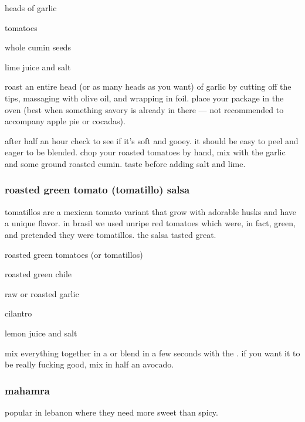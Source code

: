 \begin{ingredients}
  \item heads of garlic
  \item tomatoes
  \item whole cumin seeds
  \item lime juice and salt
\end{ingredients}

roast an entire head (or as many heads as you want) of garlic by cutting off 
the tips, massaging with olive oil, and wrapping in foil. place your package 
in the oven (best when something savory is already in there --- not 
recommended to accompany apple pie or \gls{cocada}s).

after half an hour check to see if it's soft and gooey. it should be easy to 
peel and eager to be blended. chop your roasted tomatoes by hand, mix with the 
garlic and some ground roasted cumin. taste before adding salt and lime.

\subsubsection{roasted green tomato (tomatillo) salsa}

tomatillos are a mexican tomato variant that grow with adorable husks and have 
a unique flavor. in brasil we used unripe red tomatoes which were, in fact, 
green, and pretended they were tomatillos. the salsa tasted great.

\begin{ingredients}
  \item roasted green tomatoes (or tomatillos)
  \item roasted green chile
  \item raw or roasted garlic
  \item cilantro
  \item lemon juice and salt
\end{ingredients}

mix everything together in a  or blend in a few seconds with the . 
if you want it to be really fucking good, mix in half an avocado.

\subsubsection{\gls{mahamra}}

popular in lebanon where they need more sweet than spicy.


